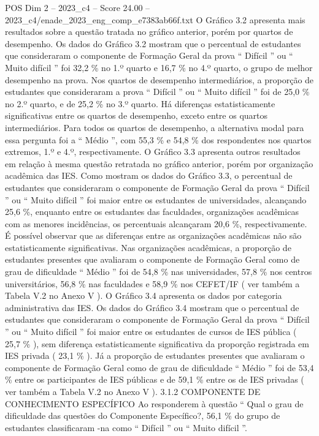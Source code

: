 \begin{textsample}{POS Dim 2 – 2023\_c4 – Score 24.00 – 2023\_c4/enade\_2023\_eng\_comp\_e7383ab66f.txt}
O Gráfico 3.2 apresenta mais resultados sobre a questão tratada no gráfico anterior, porém por quartos de desempenho.
Os dados do Gráfico 3.2 mostram que o percentual de estudantes que consideraram o componente de Formação Geral da prova “ Difícil ” ou “ Muito difícil ” foi 32,2 \% no 1.º quarto e 16,7 \% no 4.º quarto, o grupo de melhor desempenho na prova.
Nos quartos de desempenho intermediários, a proporção de estudantes que consideraram a prova “ Difícil ” ou “ Muito difícil ” foi de 25,0 \% no 2.º quarto, e de 25,2 \% no 3.º quarto.
Há diferenças estatisticamente significativas entre os quartos de desempenho, exceto entre os quartos intermediários.
Para todos os quartos de desempenho, a alternativa modal para essa pergunta foi a “ Médio ”, com 55,3 \% e 54,8 \% dos respondentes nos quartos extremos, 1.º e 4.º, respectivamente.
O Gráfico 3.3 apresenta outros resultados em relação à mesma questão retratada no gráfico anterior, porém por organização acadêmica das IES.
Como mostram os dados do Gráfico 3.3, o percentual de estudantes que consideraram o componente de Formação Geral da prova “ Difícil ” ou “ Muito difícil ” foi maior entre os estudantes de universidades, alcançando 25,6 \%, enquanto entre os estudantes das faculdades, organizações acadêmicas com as menores incidências, os percentuais alcançaram 20,6 \%, respectivamente.
É possível observar que as diferenças entre as organizações acadêmicas não são estatisticamente significativas.
Nas organizações acadêmicas, a proporção de estudantes presentes que avaliaram o componente de Formação Geral como de grau de dificuldade “ Médio ” foi de 54,8 \% nas universidades, 57,8 \% nos centros universitários, 56,8 \% nas faculdades e 58,9 \% nos CEFET/IF ( ver também a Tabela V.2 no Anexo V ).
O Gráfico 3.4 apresenta os dados por categoria administrativa das IES.
Os dados do Gráfico 3.4 mostram que o percentual de estudantes que consideraram o componente de Formação Geral da prova “ Difícil ” ou “ Muito difícil ” foi maior entre os estudantes de cursos de IES pública ( 25,7 \% ), sem diferença estatisticamente significativa da proporção registrada em IES privada ( 23,1 \% ).
Já a proporção de estudantes presentes que avaliaram o componente de Formação Geral como de grau de dificuldade “ Médio ” foi de 53,4 \% entre os participantes de IES públicas e de 59,1 \% entre os de IES privadas ( ver também a Tabela V.2 no Anexo V ). 3.1.2 COMPONENTE DE CONHECIMENTO ESPECÍFICO Ao responderem à questão “ Qual o grau de dificuldade das questões do Componente Específico?, 56,1 \% do grupo de estudantes classificaram -na como “ Difícil ” ou “ Muito difícil ”.

\end{textsample}
